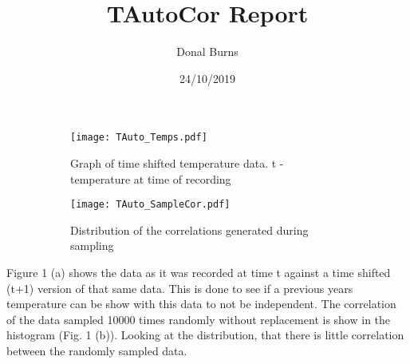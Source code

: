 \documentclass[a4paper, 12pt]{article}
\title{TAutoCor Report}
\author{Donal Burns}
\date{24/10/2019}
\begin{document}
  
  


 
\begin{figure}[h!]
  \centering
  \begin{subfigure}[t]{0.4\linewidth}
    \texttt{[image: TAuto\_Temps.pdf]}
    \caption{Graph of time shifted temperature data. \newline t - temperature at time of recording}
    \label{Figure 1}
  \end{subfigure}
  \begin{subfigure}[t]{0.4\linewidth}
    \texttt{[image: TAuto\_SampleCor.pdf]}
    \caption{Distribution of the correlations generated during sampling}
  \end{subfigure}
  \caption{}
  \label{Figure 2}
\end{figure}

Figure 1 (a) shows the data as it was recorded at time t against a time shifted (t+1) version of that same data.  This is done to see if a previous years temperature can be show with this data to not be independent.  The correlation of the data sampled 10000 times randomly without replacement is show in the histogram (Fig. 1 (b)).  Looking at the distribution, that there is little correlation between the randomly sampled data.
\end{document}
